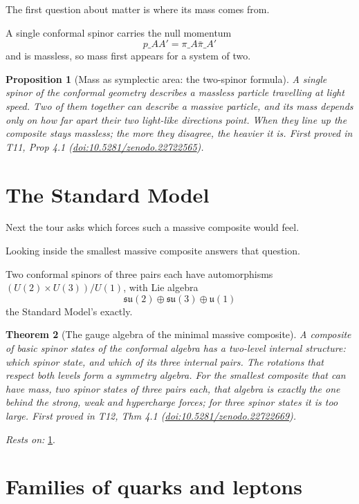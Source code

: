 \documentclass[11pt]{article}
\newtheorem{theorem}{Theorem}[section]
\newtheorem{proposition}[theorem]{Proposition}
\theoremstyle{definition}
\theoremstyle{plain}
\providecommand{\su}{}\renewcommand{\su}{\mathfrak{su}}
\providecommand{\uu}{}\renewcommand{\uu}{\mathfrak{u}}
\begin{document}
The first question about matter is where its mass comes from.

A single conformal spinor carries the null momentum \[ p\_{AA'} = \pi\_{A}\bar\pi\_{A'} \] and is massless, so mass first appears for a system of two.

\begin{proposition}[Mass as symplectic area: the two-spinor formula]\label{c:mass.mass-symplectic-area-two-twistor-formula}
A single spinor of the conformal geometry describes a massless particle travelling at light speed. Two of them together can describe a massive particle, and its mass depends only on how far apart their two light-like directions point. When they line up the composite stays massless; the more they disagree, the heavier it is.
\emph{First proved in} T11, Prop 4.1 (\href{https://doi.org/10.5281/zenodo.22722565}{doi:10.5281/zenodo.22722565}).
\end{proposition}

\section{The Standard Model}

Next the tour asks which forces such a massive composite would feel.

Looking inside the smallest massive composite answers that question.

Two conformal spinors of three pairs each have automorphisms $(U(2) \times U(3))/U(1)$, with Lie algebra \[ \su(2) \oplus \su(3) \oplus \uu(1) \] the Standard Model's exactly.

\begin{theorem}[The gauge algebra of the minimal massive composite]\label{c:standard-model.gauge-algebra-minimal-massive-composite}
A composite of basic spinor states of the conformal algebra has a two-level internal structure: which spinor state, and which of its three internal pairs. The rotations that respect both levels form a symmetry algebra. For the smallest composite that can have mass, two spinor states of three pairs each, that algebra is exactly the one behind the strong, weak and hypercharge forces; for three spinor states it is too large.
\emph{First proved in} T12, Thm 4.1 (\href{https://doi.org/10.5281/zenodo.22722669}{doi:10.5281/zenodo.22722669}).
\end{theorem}
\noindent\emph{Rests on:} \ref{c:mass.mass-symplectic-area-two-twistor-formula}.

\section{Families of quarks and leptons}
\end{document}
